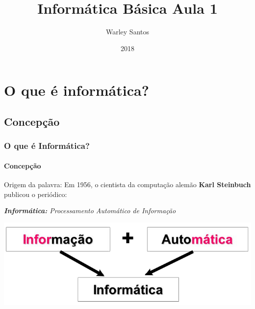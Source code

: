 \documentclass[12pt,a4paper,final]{beamer}
\author{Warley Santos}
\title{Informática Básica Aula 1}
\institute{Associação Gesto de Amor}
\date{2018}
\begin{document}
	\begin{frame}
		\titlepage
	\end{frame}
    \section{O que é informática?}
        \subsection{Concepção}
            \begin{frame}
                \frametitle{O que é Informática?}
                \framesubtitle{Concepção}
                \begin{block}{Origem da palavra:}
                    Em 1956, o cientista da computação alemão \textbf{Karl Steinbuch} publicou o periódico:
                 \end{block}
                 \begin{block}{}
                    \emph{\textbf{Informática:} Processamento Automático de Informação}
                \end{block}
                \begin{block}{}
                     \centering
                     \includegraphics[scale=0.3]{Imagens/informatica.png}
                \end{block}
            \end{frame}
\end{document}
